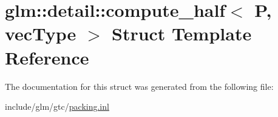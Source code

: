 \hypertarget{structglm_1_1detail_1_1compute__half}{}\section{glm\+:\+:detail\+:\+:compute\+\_\+half$<$ P, vec\+Type $>$ Struct Template Reference}
\label{structglm_1_1detail_1_1compute__half}


The documentation for this struct was generated from the following file\+:\begin{DoxyCompactItemize}
\item 
include/glm/gtc/\hyperlink{packing_8inl}{packing.\+inl}\end{DoxyCompactItemize}
